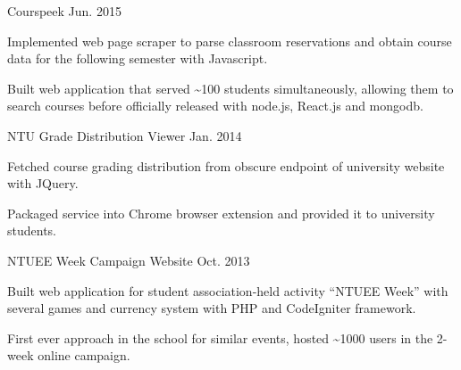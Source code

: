   \begin{cventries}
    \cventry
      {}
      {Courspeek}
      {Jun. 2015}
      {}
      {
        \begin{cvitems}
          \item {Implemented web page scraper to parse classroom reservations and obtain course data for the following semester with Javascript.}
          \item {Built web application that served \textasciitilde100 students simultaneously, allowing them to search courses before officially released with node.js, React.js and mongodb.}
        \end{cvitems}
      }
    \cventry
      {}
      {NTU Grade Distribution Viewer}
      {Jan. 2014}
      {}
      {
        \begin{cvitems}
          \item {Fetched course grading distribution from obscure endpoint of university website with JQuery.}
          \item {Packaged service into Chrome browser extension and provided it to university students.}
        \end{cvitems}
      }
    \cventry
      {}
      {NTUEE Week Campaign Website}
      {Oct. 2013}
      {}
      {
        \begin{cvitems}
          \item {Built web application for student association-held activity “NTUEE Week” with several games and currency system with PHP and CodeIgniter framework.}
          \item {First ever approach in the school for similar events, hosted \textasciitilde1000 users in the 2-week online campaign.}
        \end{cvitems}
      }
  \end{cventries}